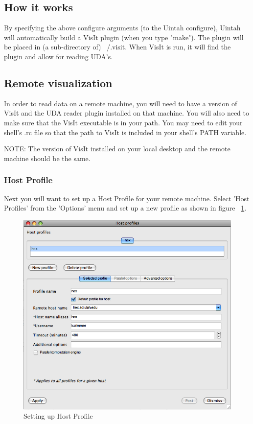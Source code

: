 \documentclass[12pt]{article}
\begin{document}
\subsection{How it works}
By specifying the above configure arguments (to the Uintah configure), Uintah will automatically build a VisIt plugin (when you type "make"). The plugin will be placed in (a sub-directory of) ~/.visit. When VisIt is run, it will find the plugin and allow for reading UDA's.

\subsection{Remote visualization}
In order to read data on a remote machine, you will need to have a version of VisIt and the UDA reader plugin installed on that machine. You will also need to make sure that the VisIt executable is in your path. You may need to edit your shell's .rc file so that the path to VisIt is included in your shell's PATH variable.

NOTE: The version of VisIt installed on your local desktop and the remote machine should be the same.

\subsubsection{Host Profile}
Next you will want to set up a Host Profile for your remote machine. Select 'Host Profiles' from the 'Options' menu and set up a new profile as shown in figure ~\ref{VisItHostProfile}.

\begin{figure}
  \center
  \includegraphics[scale=0.5]{VisItHostProfile.png}
  \caption{Setting up Host Profile}
  \label{VisItHostProfile}
\end{figure}
\end{document}
